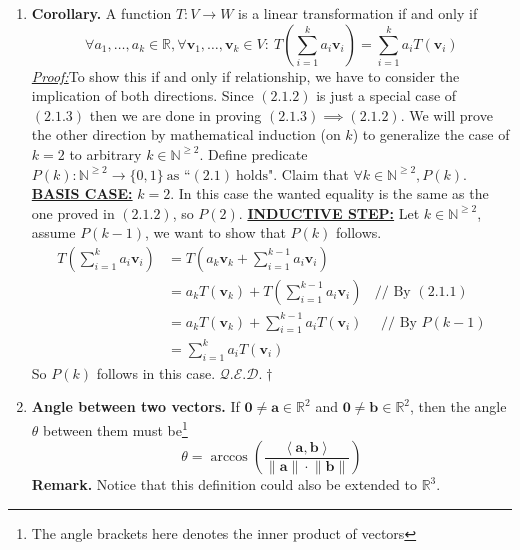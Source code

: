 \documentclass[oneside, 12pt]{book}
\newcommand{\settag}[1]{\renewcommand{\theenumi}{#1}}
\newcommand{\R}{\mathbb{R}}
\newcommand{\double}[1]{\mathbb{#1}} %
\newcommand{\qed}{\hfill $\mathcal{Q}.\mathcal{E}.\mathcal{D}.\dagger$}
\newcommand{\tbf}[1]{\textbf{#1}}
\newcommand{\tit}[1]{\textit{#1}}
\newcommand{\proof}{\tit{\underline{Proof:}}} %
\begin{document}
\begin{enumerate}
        \settag{2.1.3}
        \item \tbf{Corollary.} A function $T:V\xrightarrow{}W$ is a linear transformation if and only if
        \begin{equation}
            \forall a_1,\ldots,a_k\in \R, \forall \mathbf{v}_1, \ldots,\mathbf{v}_k\in V:~ 
            T\left(\sum_{i=1}^{k}a_i\mathbf{v}_i\right) = \sum_{i=1}^{k}a_i T\left(\mathbf{v}_i\right)
        \end{equation}
        \proof To show this if and only if relationship, we have to consider the implication of both directions. Since $(2.1.2)$ is just a special case of $(2.1.3)$ then we are done in proving $(2.1.3)\implies (2.1.2)$. We will prove the other direction by mathematical induction (on $k$) to generalize the case of $k=2$ to arbitrary $k\in \double{N}^{\geq 2}$. \newline
        Define predicate $P(k): \double{N}^{\geq 2} \rightarrow{} \{0, 1\}~\text{as ``}(2.1)~\text{holds"}$. \newline
        Claim that $\forall k \in \double{N}^{\geq 2}, P(k)$.\newline
        \tbf{\underline{BASIS CASE:}} $k = 2$. In this case the wanted equality is the same as the one proved in $(2.1.2)$, so $P(2)$. \newline
        \tbf{\underline{INDUCTIVE STEP:}} Let $k\in \double{N}^{\geq 2}$, assume $P(k-1)$, we want to show that $P(k)$ follows.\newline
        \begin{align*}
            T\left(\sum_{i=1}^{k}a_i\mathbf{v}_i\right) &= T\left(a_k\mathbf{v}_k + \sum_{i=1}^{k-1}a_i\mathbf{v}_i\right) \\
            &= a_k T(\mathbf{v}_k) + T\left(\sum_{i=1}^{k-1}a_i\mathbf{v}_i\right)~~~~\text{// By $(2.1.1)$} \\
            &= a_k T(\mathbf{v}_k) + \sum_{i=1}^{k-1}a_i T\left(\mathbf{v}_i\right)~~~~~~\text{// By $P(k-1)$}\\
            &= \sum_{i=1}^{k}a_i T\left(\mathbf{v}_i\right)
        \end{align*}
        So $P(k)$ follows in this case.
        \qed
        
        \settag{2.1.9}
        \item \tbf{Angle between two vectors.} If $\mathbf{0}\neq \mathbf{a}\in \R^2$ and $\mathbf{0}\neq \mathbf{b}\in \R^2$, then the angle $\theta$ between them must be\footnote{The angle brackets here denotes the inner product of vectors}
        \begin{equation*}
            \theta = \arccos\left( \frac{\left<\mathbf{a},\mathbf{b}\right>}{\lVert\mathbf{a}\rVert \cdot \lVert\mathbf{b}\rVert}\right)
        \end{equation*}
        \tbf{Remark.} Notice that this definition could also be extended to $\R^3$.
        

\end{enumerate}
\end{document}
